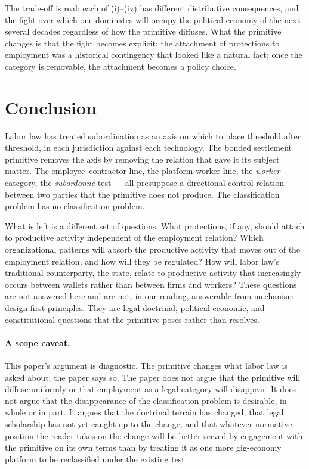 \documentclass[11pt,a4paper]{article}
\theoremstyle{remark}
\begin{document}
The trade-off is real: each of (i)--(iv) has different
distributive consequences, and the fight over which one
dominates will occupy the political economy of the next several
decades regardless of how the primitive diffuses. What the
primitive changes is that the fight becomes explicit: the
attachment of protections to employment was a historical
contingency that looked like a natural fact; once the category
is removable, the attachment becomes a policy choice.

\section{Conclusion}
\label{sec:conclusion}

Labor law has treated subordination as an axis on which to place
threshold after threshold, in each jurisdiction against each
technology. The bonded settlement primitive removes the axis by
removing the relation that gave it its subject matter. The
employee--contractor line, the platform-worker line, the \emph{worker}
category, the \emph{subordonné} test --- all presuppose a
directional control relation between two parties that the primitive
does not produce. The classification problem has no classification
problem.

What is left is a different set of questions. What protections, if
any, should attach to productive activity independent of the
employment relation? Which organizational patterns will absorb the
productive activity that moves out of the employment relation, and
how will they be regulated? How will labor law's traditional
counterparty, the state, relate to productive activity that
increasingly occurs between wallets rather than between firms and
workers? These questions are not answered here and are not, in our
reading, answerable from mechanism-design first principles. They
are legal-doctrinal, political-economic, and constitutional
questions that the primitive poses rather than resolves.

\paragraph{A scope caveat.}
This paper's argument is diagnostic. The primitive changes what
labor law is asked about; the paper says so. The paper does not
argue that the primitive will diffuse uniformly or that employment
as a legal category will disappear. It does not argue that the
disappearance of the classification problem is desirable, in whole
or in part. It argues that the doctrinal terrain has changed,
that legal scholarship has not yet caught up to the change, and
that whatever normative position the reader takes on the change
will be better served by engagement with the primitive on its own
terms than by treating it as one more gig-economy platform to be
reclassified under the existing test.
\end{document}
